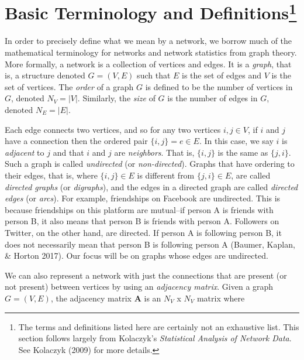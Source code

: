\documentclass[12pt,twoside]{amherstthesis}
\begin{document}
  \section[Basic Terminology and Definitions]{\texorpdfstring{Basic
  Terminology and Definitions\footnote{The terms and definitions listed
    here are certainly not an exhaustive list. This section follows
    largely from Kolaczyk's \emph{Statistical Analysis of Network Data}.
    See Kolaczyk (2009) for more details.}}{Basic Terminology and Definitions}}\label{basic-terminology-and-definitions-1}
  
  In order to precisely define what we mean by a network, we borrow much
  of the mathematical terminology for networks and network statistics from
  graph theory. More formally, a network is a collection of vertices and
  edges. It is a \emph{graph}, that is, a structure denoted \(G = (V, E)\)
  such that \(E\) is the set of edges and \(V\) is the set of vertices.
  The \emph{order} of a graph \(G\) is defined to be the number of
  vertices in \(G\), denoted \(N_V = |V|\). Similarly, the \emph{size} of
  \(G\) is the number of edges in \(G\), denoted \(N_E = |E|\).
  
  Each edge connects two vertices, and so for any two vertices
  \(i, j \in V\), if \(i\) and \(j\) have a connection then the ordered
  pair \(\{i, j\} = e \in E\). In this case, we say \(i\) is
  \emph{adjacent} to \(j\) and that \(i\) and \(j\) are \emph{neighbors}.
  That is, \(\{i, j\}\) is the same as \(\{j, i\}\). Such a graph is
  called \emph{undirected} (or \emph{non-directed}). Graphs that have
  ordering to their edges, that is, where \(\{i, j\} \in E\) is different
  from \(\{j, i\} \in E\), are called \emph{directed graphs} (or
  \emph{digraphs}), and the edges in a directed graph are called
  \emph{directed edges} (or \emph{arcs}). For example, friendships on
  Facebook are undirected. This is because friendships on this platform
  are mutual--if person A is friends with person B, it also means that
  person B is friends with person A. Followers on Twitter, on the other
  hand, are directed. If person A is following person B, it does not
  necessarily mean that person B is following person A (Baumer, Kaplan, \&
  Horton 2017). Our focus will be on graphs whose edges are undirected.
  
  We can also represent a network with just the connections that are
  present (or not present) between vertices by using an \emph{adjacency
  matrix}. Given a graph \(G = (V, E)\), the adjacency matrix
  \(\textbf{A}\) is an \(N_V\) x \(N_V\) matrix where
  
\end{document}
